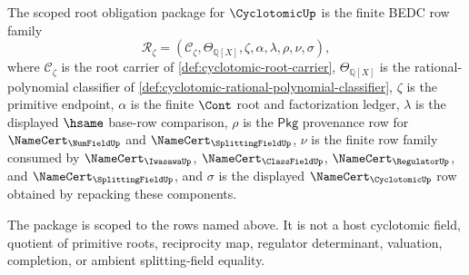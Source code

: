 \begin{definition}
\label{def:cyclotomic-root-scoped-obligation-package}
The scoped root obligation package for $\CyclotomicUp$ is the finite BEDC row
family
$$
\mathcal{R}_{\zeta}=(\mathcal{C}_{\zeta},\Theta_{\mathbb{Q}[X]},\zeta,\alpha,\lambda,\rho,\nu,\sigma),
$$
where $\mathcal{C}_{\zeta}$ is the root carrier of
\autoref{def:cyclotomic-root-carrier}, $\Theta_{\mathbb{Q}[X]}$ is the
rational-polynomial classifier of
\autoref{def:cyclotomic-rational-polynomial-classifier}, $\zeta$ is the
primitive endpoint, $\alpha$ is the finite $\Cont$ root and factorization
ledger, $\lambda$ is the displayed $\hsame$ base-row comparison, $\rho$ is the
$\mathsf{Pkg}$ provenance row for $\NameCert_{\NumFieldUp}$ and
$\NameCert_{\SplittingFieldUp}$, $\nu$ is the finite row family consumed by
$\NameCert_{\IwasawaUp}$, $\NameCert_{\ClassFieldUp}$,
$\NameCert_{\RegulatorUp}$, and $\NameCert_{\SplittingFieldUp}$, and $\sigma$
is the displayed $\NameCert_{\CyclotomicUp}$ row obtained by repacking these
components.

The package is scoped to the rows named above. It is not a host cyclotomic
field, quotient of primitive roots, reciprocity map, regulator determinant,
valuation, completion, or ambient splitting-field equality.
\end{definition}

